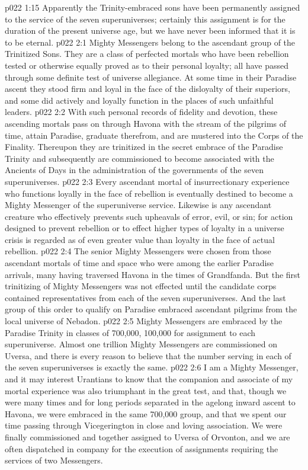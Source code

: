 \vs p022 1:15 Apparently the Trinity\hyp{}embraced sons have been permanently assigned to the service of the seven superuniverses; certainly this assignment is for the duration of the present universe age, but we have never been informed that it is to be eternal.
\vs p022 2:1 Mighty Messengers belong to the ascendant group of the Trinitized Sons. They are a class of perfected mortals who have been rebellion tested or otherwise equally proved as to their personal loyalty; all have passed through some definite test of universe allegiance. At some time in their Paradise ascent they stood firm and loyal in the face of the disloyalty of their superiors, and some did actively and loyally function in the places of such unfaithful leaders.
\vs p022 2:2 With such personal records of fidelity and devotion, these ascending mortals pass on through Havona with the stream of the pilgrims of time, attain Paradise, graduate therefrom, and are mustered into the Corps of the Finality. Thereupon they are trinitized in the secret embrace of the Paradise Trinity and subsequently are commissioned to become associated with the Ancients of Days in the administration of the governments of the seven superuniverses.
\vs p022 2:3 Every ascendant mortal of insurrectionary experience who functions loyally in the face of rebellion is eventually destined to become a Mighty Messenger of the superuniverse service. Likewise is any ascendant creature who effectively prevents such upheavals of error, evil, or sin; for action designed to prevent rebellion or to effect higher types of loyalty in a universe crisis is regarded as of even greater value than loyalty in the face of actual rebellion.
\vs p022 2:4 The senior Mighty Messengers were chosen from those ascendant mortals of time and space who were among the earlier Paradise arrivals, many having traversed Havona in the times of Grandfanda. But the first trinitizing of Mighty Messengers was not effected until the candidate corps contained representatives from each of the seven superuniverses. And the last group of this order to qualify on Paradise embraced ascendant pilgrims from the local universe of Nebadon.
\vs p022 2:5 Mighty Messengers are embraced by the Paradise Trinity in classes of 700,000, 100,000 for assignment to each superuniverse. Almost one trillion Mighty Messengers are commissioned on Uversa, and there is every reason to believe that the number serving in each of the seven superuniverses is exactly the same.
\vs p022 2:6 \pc I am a Mighty Messenger, and it may interest Urantians to know that the companion and associate of my mortal experience was also triumphant in the great test, and that, though we were many times and for long periods separated in the agelong inward ascent to Havona, we were embraced in the same 700,000 group, and that we spent our time passing through Vicegerington in close and loving association. We were finally commissioned and together assigned to Uversa of Orvonton, and we are often dispatched in company for the execution of assignments requiring the services of two Messengers.
